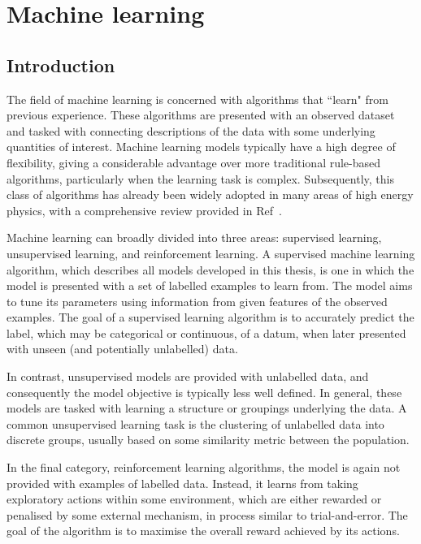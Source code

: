 \chapter{Machine learning}
\label{chap:machineLearning}

\section{Introduction}

The field of machine learning is concerned with algorithms that ``learn" from previous experience. 
These algorithms are presented with an observed dataset and tasked with connecting descriptions of the data with some underlying quantities of interest. Machine learning models typically have a high degree of flexibility, giving a considerable advantage over more traditional rule-based algorithms, particularly when the learning task is complex.
Subsequently, this class of algorithms has already been widely adopted in many areas of high energy physics, with a comprehensive review provided in Ref~\cite{ml_in_hep}.

Machine learning can broadly divided into three areas: supervised learning, unsupervised learning, and reinforcement learning. A supervised machine learning algorithm, which describes all models developed in this thesis, is one in which the model is presented with a set of labelled examples to learn from. The model aims to tune its parameters using information from given features of the observed examples. The goal of a supervised learning algorithm is to accurately predict the label, which may be categorical or continuous, of a datum, when later presented with unseen (and potentially unlabelled) data. 

In contrast, unsupervised models are provided with unlabelled data, and consequently the model objective is typically less well defined. In general, these models are tasked with learning a structure or groupings underlying the data. A common unsupervised learning task is the clustering of unlabelled data into discrete groups, usually based on some similarity metric between the population. %

In the final category, reinforcement learning algorithms, the model is again not provided with examples of labelled data. Instead, it learns from taking exploratory actions within some environment, which are either rewarded or penalised by some external mechanism, in process similar to trial-and-error. The goal of the algorithm is to maximise the overall reward achieved by its actions. 

